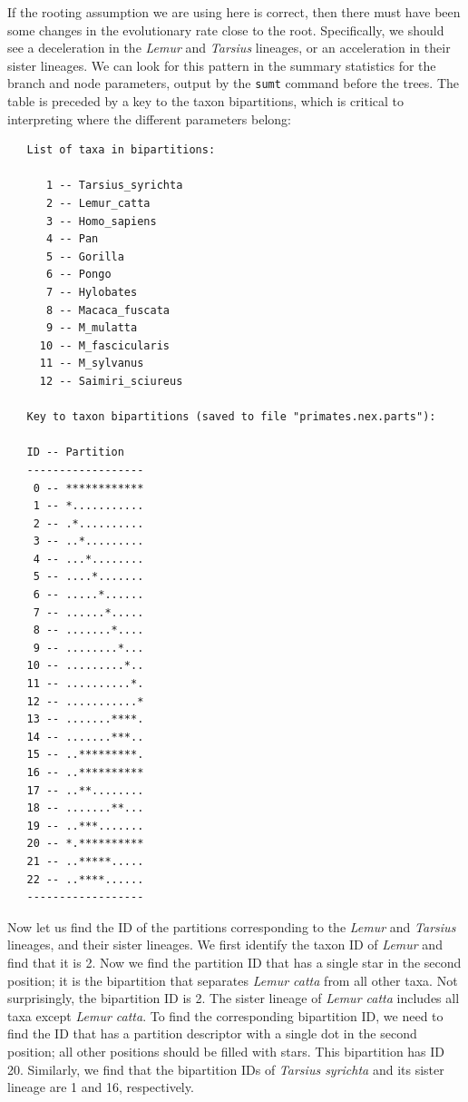 \documentclass[12pt]{book}
\newcommand{\ttt}[1]{\texttt{#1}}
\begin{document}
If the rooting assumption we are using here is correct, then there must have been some changes in
the evolutionary rate close to the root. Specifically, we should see a deceleration in the
\textit{Lemur} and \textit{Tarsius} lineages, or an acceleration in their sister lineages. We can
look for this pattern in the summary statistics for the branch and node parameters, output by the
\ttt{sumt} command before the trees. The table is preceded by a key to the taxon bipartitions,
which is critical to interpreting where the different parameters belong:

\begin{singlespacing}
\footnotesize
\begin{verbatim}
   List of taxa in bipartitions:                                                 
                                                                                   
      1 -- Tarsius_syrichta
      2 -- Lemur_catta
      3 -- Homo_sapiens
      4 -- Pan
      5 -- Gorilla
      6 -- Pongo
      7 -- Hylobates
      8 -- Macaca_fuscata
      9 -- M_mulatta
     10 -- M_fascicularis
     11 -- M_sylvanus
     12 -- Saimiri_sciureus

   Key to taxon bipartitions (saved to file "primates.nex.parts"):

   ID -- Partition
   ------------------
    0 -- ************
    1 -- *...........
    2 -- .*..........
    3 -- ..*.........
    4 -- ...*........
    5 -- ....*.......
    6 -- .....*......
    7 -- ......*.....
    8 -- .......*....
    9 -- ........*...
   10 -- .........*..
   11 -- ..........*.
   12 -- ...........*
   13 -- .......****.
   14 -- .......***..
   15 -- ..*********.
   16 -- ..**********
   17 -- ..**........
   18 -- .......**...
   19 -- ..***.......
   20 -- *.**********
   21 -- ..*****.....
   22 -- ..****......
   ------------------
\end{verbatim}
\end{singlespacing}
\normalsize

Now let us find the ID of the partitions corresponding to the \textit{Lemur} and \textit{Tarsius}
lineages, and their sister lineages. We first identify the taxon ID of \textit{Lemur} and find that
it is 2. Now we find the partition ID that has a single star in the second position; it is the
bipartition that separates \textit{Lemur catta} from all other taxa. Not surprisingly, the
bipartition ID is 2. The sister lineage of \textit{Lemur catta} includes all taxa except
\textit{Lemur catta}. To find the corresponding bipartition ID, we need to find the ID that has a
partition descriptor with a single dot in the second position; all other positions should be filled
with stars. This bipartition has ID 20. Similarly, we find that the bipartition IDs of
\textit{Tarsius syrichta} and its sister lineage are 1 and 16, respectively.
\end{document}
